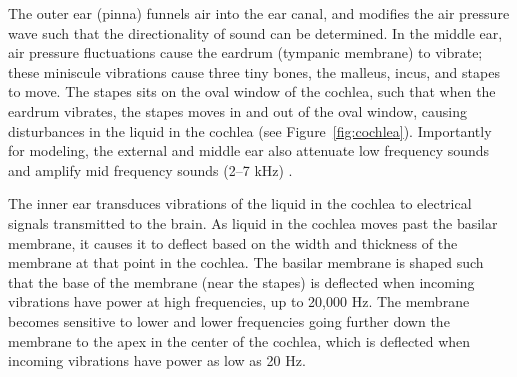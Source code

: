 The outer ear (pinna) funnels air
into the ear canal,
and modifies the air pressure wave
such that the directionality
of sound can be determined.
In the middle ear,
air pressure fluctuations
cause the eardrum (tympanic membrane)
to vibrate;
these miniscule vibrations
cause three tiny bones,
the malleus, incus, and stapes to move.
The stapes sits on the oval window
of the cochlea,
such that when the eardrum vibrates,
the stapes moves in and out of the oval window,
causing disturbances in the liquid
in the cochlea
(see Figure~\ref{fig:cochlea}).
Importantly for modeling,
the external and middle ear
also attenuate low frequency sounds
and amplify mid frequency sounds
(2--7 kHz)
\citep{rosowski1996,ballachanda1997}.


The inner ear transduces vibrations
of the liquid in the cochlea
to electrical signals transmitted
to the brain.
As liquid in the cochlea
moves past the basilar membrane,
it causes it to deflect
based on the width and thickness
of the membrane at that point
in the cochlea.
The basilar membrane
is shaped such that
the base of the membrane
(near the stapes)
is deflected when
incoming vibrations have power
at high frequencies,
up to 20,000 Hz.
The membrane becomes sensitive
to lower and lower frequencies
going further down the membrane
to the apex
in the center of the cochlea,
which is deflected when incoming vibrations
have power as low as 20 Hz.

